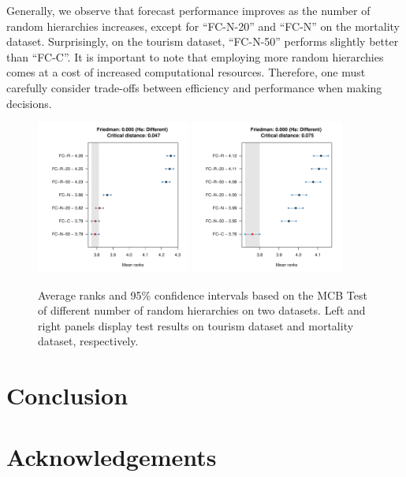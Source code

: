 \documentclass[a4paper,review,12pt,authoryear]{elsarticle}
\begin{document}
Generally, we observe that forecast performance improves as the number of random hierarchies increases, except for ``FC-N-20'' and ``FC-N'' on the mortality dataset. Surprisingly, on the tourism dataset, ``FC-N-50'' performs slightly better than ``FC-C''. It is important to note that employing more random hierarchies comes at a cost of increased computational resources. Therefore, one must carefully consider trade-offs between efficiency and performance when making decisions.

\begin{figure}
\centering
\includegraphics[width=0.45\textwidth]{figures/tourism_number_mcb.pdf}
\includegraphics[width=0.45\textwidth]{figures/mortality_number_mcb.pdf}
\caption{\label{fig:number_mcb}Average ranks and 95\% confidence intervals based on the MCB Test of different number of random hierarchies on two datasets. Left and right panels display test results on tourism dataset and mortality dataset, respectively.}
\end{figure}

\section{Conclusion}
\label{sec:conclusion}


\section*{Acknowledgements}



\begingroup
{}


\endgroup
\end{document}
